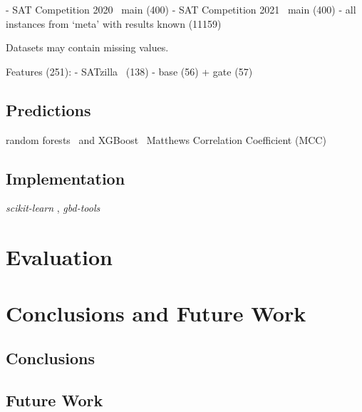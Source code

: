 \documentclass{article}
\begin{document}
- SAT Competition 2020~\cite{balyo2020proceedings} main (400)
- SAT Competition 2021~\cite{balyo2021proceedings} main (400)
- all instances from `meta' with results known (11159)

Datasets may contain missing values.

Features (251):
- SATzilla~\cite{xu2012features} (138)
- base (56) + gate (57)

\subsection{Predictions}

random forests~\cite{breiman2001random} and XGBoost~\cite{chen2016xgboost}
Matthews Correlation Coefficient (MCC)~\cite{matthews1975comparison, gorodkin2004comparing}

\subsection{Implementation}

\emph{scikit-learn} \cite{pedregosa2011scikit}, \emph{gbd-tools}~\cite{iser2020collaborative}

\section{Evaluation}
\label{sec:evaluation}

\section{Conclusions and Future Work}
\label{sec:conclusion}

\subsection{Conclusions}

\subsection{Future Work}

\printbibliography
\end{document}
